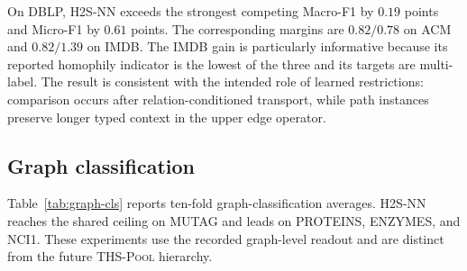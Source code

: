 \documentclass{article}
\newcommand{\method}{\textsc{H2S-NN}}
\newcommand{\thspool}{\textsc{THS-Pool}}
\begin{document}
On DBLP, \method{} exceeds the strongest competing Macro-F1 by $0.19$ points and Micro-F1 by
$0.61$ points. The corresponding margins are $0.82/0.78$ on ACM and $0.82/1.39$ on IMDB. The IMDB
gain is particularly informative because its reported homophily indicator is the lowest of the
three and its targets are multi-label. The result is consistent with the intended role of learned
restrictions: comparison occurs after relation-conditioned transport, while path instances preserve
longer typed context in the upper edge operator.

\subsection{Graph classification}

Table~\ref{tab:graph-cls} reports ten-fold graph-classification averages. \method{} reaches the
shared ceiling on MUTAG and leads on PROTEINS, ENZYMES, and NCI1. These experiments use the recorded
graph-level readout and are distinct from the future \thspool{} hierarchy.
\end{document}

